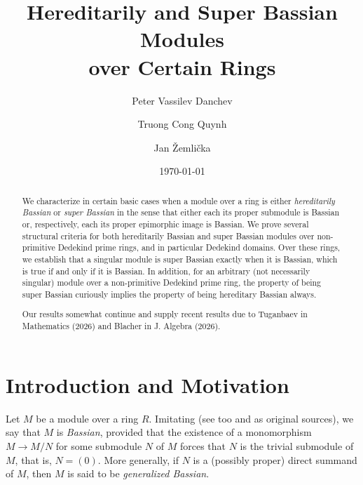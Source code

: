 \documentclass{amsart}
\theoremstyle{definition}
\begin{document}
\title[Hereditarily and Super Bassian Modules ...]{Hereditarily and Super Bassian Modules \\ over Certain Rings}

\author[P. V. Danchev]{Peter Vassilev Danchev}
\address{Bulgarian Academy of Sciences, Institute of Mathematics and Informatics, Sofia 1113, Bulgaria}
\author[T. C. Quynh]{Truong Cong Quynh}
\address{Faculty of  Mathematics, The University of Danang - University of Science and Education,  Da Nang 550000, Vietnam}
\author[J. \v{Z}emli\v{c}ka]{Jan \v{Z}emli\v{c}ka}
\address{Department of Algebra, MFF UK, Sokolovsk\' a 83, 186 75 Praha 8, Czechia}

\begin{abstract} We characterize in certain basic cases when a module over a ring is either {\it hereditarily Bassian} or {\it super Bassian} in the sense that either each its proper submodule is Bassian or, respectively, each its proper epimorphic image is Bassian. We prove several structural criteria for both hereditarily Bassian and super Bassian modules over non-primitive Dedekind prime rings, and in particular Dedekind domains. Over these rings, we establish that a singular module is super Bassian exactly when it is Bassian, which is true if and only if it is Bassian. In addition, for an arbitrary (not necessarily singular) module over a non-primitive Dedekind prime ring, the property of being super Bassian curiously implies the property of being hereditary Bassian always.

Our results somewhat continue and supply recent results due to Tuganbaev in Mathematics (2026) and Blacher in J. Algebra (2026).
\end{abstract}

\date{\today}

\maketitle

\section*{Introduction and Motivation}

Let $M$ be a module over a ring $R$.
Imitating \cite{DKTZ} (see too \cite{CDG} and \cite{DG} as original sources), we say that $M$ is {\it Bassian}, provided that the existence of a monomorphism $M \to M/N$ for some submodule $N$ of $M$ forces that $N$ is the trivial submodule of $M$, that is, $N=(0)$. More generally, if $N$ is a (possibly proper) direct summand of $M$, then $M$ is said to be {\it generalized Bassian}.
\end{document}
